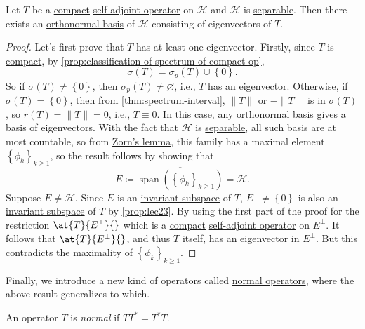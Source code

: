 \begin{theorem}\label{thm:spectral-theorem-for-compact-self-adjoint-op}
	Let \(T\) be a \hyperref[def:compact-op]{compact} \hyperref[def:self-adjoint-op]{self-adjoint operator} on \(\mathcal{H} \) and \(\mathcal{H} \) is \hyperref[def:separable]{separable}. Then there exists an \hyperref[def:orthonormal-basis]{orthonormal basis} of \(\mathcal{H} \) consisting of eigenvectors of \(T\).
\end{theorem}
\begin{proof}
	Let's first prove that \(T\) has at least one eigenvector. Firstly, since \(T\) is \hyperref[def:compact-op]{compact}, by \autoref{prop:classification-of-spectrum-of-compact-op},
	\[
		\sigma (T) = \sigma _p(T) \cup \left\{ 0 \right\}.
	\]
	So if \(\sigma (T) \neq \left\{ 0 \right\} \), then \(\sigma _p(T) \neq \varnothing \), i.e., \(T\) has an eigenvector. Otherwise, if \(\sigma (T) = \left\{ 0 \right\} \), then from \autoref{thm:spectrum-interval}, \(\lVert T \rVert \) or \(-\lVert T \rVert \) is in \(\sigma (T)\), so \(r(T) = \lVert T \rVert = 0\), i.e., \(T \equiv 0\). In this case, any \hyperref[def:orthonormal-basis]{orthonormal basis} gives a basis of eigenvectors. With the fact that \(\mathcal{H} \) is \hyperref[def:separable]{separable}, all such basis are at most countable, so from \href{https://en.wikipedia.org/wiki/Zorn%27s_lemma}{Zorn's lemma}, this family has a maximal element \(\left\{ \phi _k \right\}_{k\geq 1} \), so the result follows by showing that 
	\[
		E \coloneqq \overline{\mathop{\mathrm{span}}(\left\{ \phi _k \right\}_{k\geq 1} )} = \mathcal{H} .
	\]
	Suppose \(E \neq \mathcal{H} \). Since \(E\) is an \hyperref[def:invariant-subspace]{invariant subspace} of \(T\), \(E^{\perp} \neq \left\{ 0 \right\} \) is also an \hyperref[def:invariant-subspace]{invariant subspace} of \(T\) by \autoref{prop:lec23}. By using the first part of the proof for the restriction \(\at{T}{E^{\perp} }{} \) which is a \hyperref[def:compact-op]{compact} \hyperref[def:self-adjoint-op]{self-adjoint operator} on \(E^{\perp} \). It follows that \(\at{T}{E^{\perp} }{} \), and thus \(T\) itself, has an eigenvector in \(E^{\perp} \). But this contradicts the maximality of \(\left\{ \phi _k \right\}_{k\geq 1} \).
\end{proof}

Finally, we introduce a new kind of operators called \hyperref[def:normal-op]{normal operators}, where the above result generalizes to which.

\begin{definition}\label{def:normal-op}
	An operator \(T\) is \emph{normal} if \(T T^{\ast} = T^{\ast} T\).
\end{definition}

